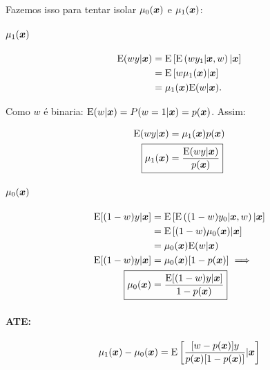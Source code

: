 \documentclass[11pt, oneside, a4paper, article]{article}
\numberwithin{equation}{section}
\begin{document}
\begin{description}
Fazemos isso para tentar isolar $\mu_{0}(\boldsymbol{x})$ e $\mu_{1}(\boldsymbol{x})$:

\paragraph{$\mu_{1}( \boldsymbol{x} )$}

\begin{align*}
	\text{E}( w y | \boldsymbol{x} ) &= \text{E}\left[  \text{E} \left( w y_{1} | \boldsymbol{x}, w  \right) | \boldsymbol{x} \right]
	\\ &=
	\text{E} \left[ w \mu_{1}(\boldsymbol{x}) | \boldsymbol{x} \right]
	\\ &=
	\mu_{1}(\boldsymbol{x}) \text{E}(w | \boldsymbol{x} ).
\end{align*}

\noindent
Como $w$ é binaria: $\text{E}(w| \boldsymbol{x}) = P(w=1 | \boldsymbol{x}) = p(\boldsymbol{x})$.
Assim:

\vspace{-1 em}
\begin{align*}
	\E( w y | \xvec ) &= \mu_{1}(\xvec) p(\xvec)
	\\
	\Aboxed{ \mu_{1}(\xvec) &= \frac{\E(w y | \xvec)}{p(\xvec)} }
\end{align*}

\paragraph{$\mu_{0}( \boldsymbol{x} )$}

\vspace{-1 em}
\begin{align*}
	\E[ (1-w) y | \xvec ] &= \E\left[  \E \left( (1 - w) y_{0} | \xvec, w  \right) | \xvec \right]
	\\ &=
	\E \left[ (1 - w) \mu_{0}(\xvec) | \xvec \right]
	\\ &=
	\mu_{0}(\xvec) \E(w | \xvec )
	\\ 
	\E[ (1-w) y | \xvec ] 
	&=
	\mu_{0}(\xvec) [1 - p(\xvec)] \implies
	\\ 
	\Aboxed{
		\mu_{0}(\xvec)
		&=
	\frac{\E[ (1-w) y | \xvec ] }{1 - p( \xvec ) } }
\end{align*}

\paragraph{ATE:}

\begin{align*}
	\mu_{1}(\boldsymbol{x}) - \mu_{0}(\boldsymbol{x}) =
	\text{E}\left[ 
		\frac{[w - p(\boldsymbol{x})] y}{p(\boldsymbol{x}) [1 - p(\boldsymbol{x})]}
		| \boldsymbol{x}
	\right]
\end{align*}


\end{description}
\end{document}
